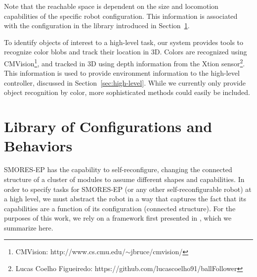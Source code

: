 \documentclass[conference]{IEEEtran}
\begin{document}
Note that the reachable space is dependent on the size and locomotion capabilities of the specific robot configuration. This information is associated with the configuration in the library introduced in Section~\ref{sec:configuration-specifics}.

To identify objects of interest to a high-level task, our system provides tools to recognize color blobs and track their location in 3D.  Colors are recognized using CMVision\footnote{CMVision: http://www.cs.cmu.edu/$\sim$jbruce/cmvision/}, and tracked in 3D using depth information from the Xtion sensor\footnote{Lucas Coelho Figueiredo: https://github.com/lucascoelho91/ballFollower}. This information is used to provide environment information to the high-level controller, discussed in Section~\ref{sec:high-level}.  While we currently only provide object recognition by color, more sophisticated methods could easily be included. 
%

\section{Library of Configurations and Behaviors}
\label{sec:configuration-specifics}
%
SMORES-EP has the capability to self-reconfigure, changing the connected structure of a cluster of modules to assume different shapes and capabilities.  In order to specify tasks for SMORES-EP (or any other self-reconfigurable robot) at a high level, we must abstract the robot in a way that captures the fact that its capabilities are a function of its configuration (connected structure). For the purposes of this work, we rely on a framework first presented in \cite{Jing2016}, which we summarize here.
\end{document}
